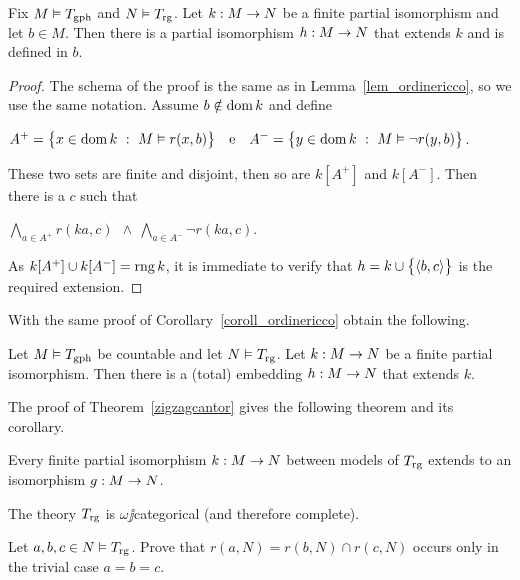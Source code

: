 \documentclass[creche.tex]{subfiles}
\begin{document}
\begin{lemma}\label{lem_graforicco}
Fix $M\models T_{\rm gph}$ and $N\models T_{\rm rg}$. Let $k:M\imp N$ be a finite partial isomorphism and let $b\in M$. Then there is a partial isomorphism $h:M\imp N$ that extends $k$ and is defined in $b$.
\end{lemma}
\begin{proof} The schema of the proof is the same as in Lemma~\ref{lem_ordinericco}, so we use the same notation. Assume $b\notin\dom k$ and define\medskip

\hfil$A^+=\big\{x\in\dom k\ :\ M\models r(x,b)\big\}\ \ \ \textrm{e}\ \ \ A^-=\big\{y\in\dom k\ :\  M\models \neg r(y,b)\big\}$.\medskip

These two sets are finite and disjoint, then so are $k[A^+]$ and $k[A^-]$. Then there is a $c$ such that\medskip

\hfil$\displaystyle\bigwedge_{a\in A^+}r(ka,c)\ \ \wedge\ \bigwedge_{a\in A^-}\neg r(ka,c)$.

As $k[A^+]\cup k[A^-]=\range k$, it is immediate to verify that $h=k\cup\big\{\<b,c\>\big\}$ is the required extension.
\end{proof}

With the same proof of Corollary~\ref{coroll_ordinericco} obtain the following.

\begin{corollary}\label{coroll_graforicco}
Let $M\models T_{\rm gph}$ be countable and let $N\models T_{\rm rg}$. Let $k:M\imp N$ be a finite partial isomorphism. Then there is a (total) embedding $h:M\imp N$ that extends $k$.\QED
\end{corollary}

The proof of Theorem~\ref{zigzagcantor} gives the following theorem and its corollary.

\begin{theorem}\label{gaomegacat}
Every finite partial isomorphism $k:M\imp N$ between models of $T_{\rm rg}$ extends to an isomorphism $g:M\imp N$.\QED
\end{theorem}

\begin{corollary}
The theory $T_{\rm rg}$ is $\omega\jj$categorical (and therefore complete).\QED
\end{corollary}

\begin{exercise}
Let $a,b,c\in N\models T_{\rm rg}$. Prove that $r(a,N)=r(b,N)\cap r(c,N)$ occurs only in the trivial case $a=b=c$.\QED
\end{exercise}
\end{document}
